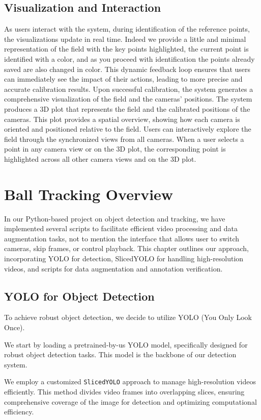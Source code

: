 \documentclass{template}
\begin{document}
\section{Visualization and Interaction}
As users interact with the system, during identification of the reference points, the visualizations update in real time. Indeed we provide a little and minimal representation of the field with the key points highlighted, the current point is identified with a color, and as you proceed with identification the points already saved are also changed in color. This dynamic feedback loop ensures that users can immediately see the impact of their actions, leading to more precise and accurate calibration results.
Upon successful calibration, the system generates a comprehensive visualization of the field and the cameras' positions. The system produces a 3D plot that represents the field and the calibrated positions of the cameras. This plot provides a spatial overview, showing how each camera is oriented and positioned relative to the field.
Users can interactively explore the field through the synchronized views from all cameras. When a user selects a point in any camera view or on the 3D plot, the corresponding point is highlighted across all other camera views and on the 3D plot. 

\chapter{Ball Tracking Overview}

In our Python-based project on object detection and tracking, we have implemented several scripts to facilitate efficient video processing and data augmentation tasks, not to mention the interface that allows user to switch cameras, skip frames, or control playback.
This chapter outlines our approach, incorporating YOLO for detection, SlicedYOLO for handling high-resolution videos, and scripts for data augmentation and annotation verification.

\section{YOLO for Object Detection}
To achieve robust object detection, we decide to utilize YOLO (You Only Look
Once).

We start by loading a pretrained-by-us YOLO model, specifically designed for robust object detection tasks. This model is the backbone of our detection system.

We employ a customized \texttt{SlicedYOLO} approach to manage high-resolution videos efficiently. This method divides video frames into overlapping slices, ensuring comprehensive coverage of the image for detection and optimizing computational efficiency.
\end{document}
